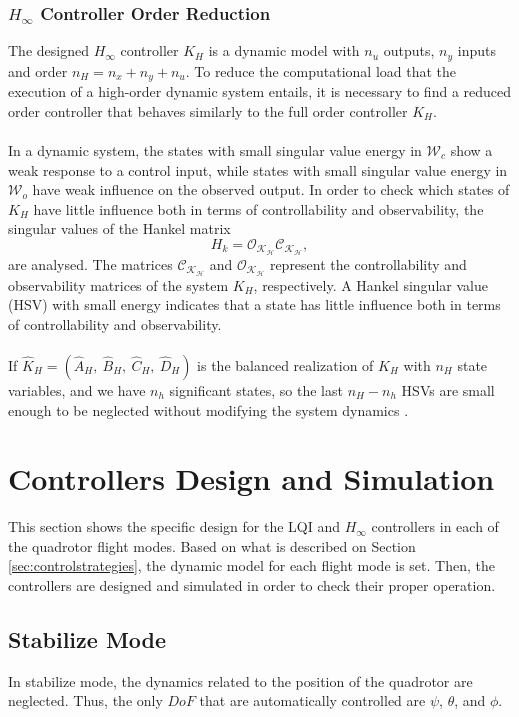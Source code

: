 \subsubsection{$H_\infty$ Controller Order Reduction}
The designed $H_{\infty}$ controller $K_H$ is a dynamic model with $n_u$ outputs, $n_y$ inputs and
order $n_H = n_{x} + n_{y} + n_{u}$. To reduce the computational load that the execution of a high-order dynamic system entails, it is necessary to find a reduced order controller that behaves similarly to the full order controller $K_H$. 
\\\\
In a dynamic system, the states with small singular value energy in $\mathcal{W}_{c}$ show a weak response to a control input, while states with small singular value energy in $\mathcal{W}_{o}$ have weak influence on the observed output. In order to check which states of $K_H$ have little influence both in terms of controllability and observability, the singular values of the Hankel matrix
\begin{equation}
H_{k} = \mathcal{O_{K_H}}\mathcal{C_{K_H}},
\end{equation}
are analysed. The matrices $\mathcal{C_{K_H}}$ and $\mathcal{O_{K_H}}$ represent the controllability and observability matrices of the system $K_H$, respectively. A Hankel singular value (HSV) with small energy indicates that a state has little influence both in terms of controllability and observability.
\\\\
If $\hat{K}_{H}=(\hat{A}_H,\ \hat{B}_H,\ \hat{C}_H,\ \hat{D}_H)$ is the balanced realization of $K_H$ with $n_H$ state variables, and we have $n_h$ significant states, so the last $n_{H}-n_{h}$ HSVs are small enough to be neglected without modifying the system dynamics \cite{Skogestad2005}. 

\section{Controllers Design and Simulation}
\label{sec:controldesign}
This section shows the specific design for the LQI and $H_\infty$ controllers in each of the quadrotor flight modes. Based on what is described on Section \ref{sec:controlstrategies}, the dynamic model for each flight mode is set. Then, the controllers are designed and simulated in order to check their proper operation.
\subsection{Stabilize Mode}
In stabilize mode, the dynamics related to the position of the quadrotor are neglected. Thus, the only $DoF$ that are automatically controlled are $\psi$, $\theta$, and $\phi$.
